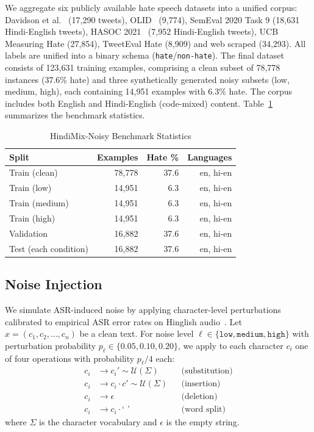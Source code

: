 \documentclass[conference]{IEEEtran}
\begin{document}
We aggregate six publicly available hate speech datasets into a unified corpus: Davidson et al.~\cite{davidson2017automated} (17,290 tweets), OLID~\cite{zampieri2019predicting} (9,774), SemEval 2020 Task 9 (18,631 Hindi-English tweets), HASOC 2021~\cite{mandl2021hasoc} (7,952 Hindi-English tweets), UCB Measuring Hate (27,854), TweetEval Hate (8,909) and web scraped (34,293). All labels are unified into a binary schema (\texttt{hate}/\texttt{non-hate}). The final dataset consists of 123,631 training examples, comprising a clean subset of 78,778 instances (37.6\% hate) and three synthetically generated noisy subsets (low, medium, high), each containing 14,951 examples with 6.3\% hate. The corpus includes both English and Hindi-English (code-mixed) content. Table~\ref{tab:benchmark} summarizes the benchmark statistics.

\begin{table}[H]
\caption{HindiMix-Noisy Benchmark Statistics}
\label{tab:benchmark}
\centering
\small
\begin{tabular}{lrrr}
\toprule
\textbf{Split} & \textbf{Examples} & \textbf{Hate \%} & \textbf{Languages} \\
\midrule
Train (clean)  & 78,778 & 37.6 & en, hi-en \\
Train (low)    & 14,951 &  6.3 & en, hi-en \\
Train (medium) & 14,951 &  6.3 & en, hi-en \\
Train (high)   & 14,951 &  6.3 & en, hi-en \\
\midrule
Validation     & 16,882 & 37.6 & en, hi-en \\
Test (each condition) & 16,882 & 37.6 & en, hi-en \\
\bottomrule
\end{tabular}
\end{table}

\subsection{Noise Injection}

We simulate ASR-induced noise by applying character-level perturbations calibrated to empirical ASR error rates on Hinglish audio~\cite{shah2020learning}. Let $x = (c_1, c_2, \ldots, c_n)$ be a clean text. For noise level $\ell \in \{\texttt{low}, \texttt{medium}, \texttt{high}\}$ with perturbation probability $p_\ell \in \{0.05, 0.10, 0.20\}$, we apply to each character $c_i$ one of four operations with probability $p_\ell / 4$ each:
\begin{align}
    c_i &\to c_i' \sim \mathcal{U}(\Sigma) && \text{(substitution)} \\
    c_i &\to c_i \cdot c' \sim \mathcal{U}(\Sigma) && \text{(insertion)} \\
    c_i &\to \epsilon && \text{(deletion)} \\
    c_i &\to c_i \cdot \texttt{` '} && \text{(word split)}
\end{align}
where $\Sigma$ is the character vocabulary and $\epsilon$ is the empty string.
\end{document}
